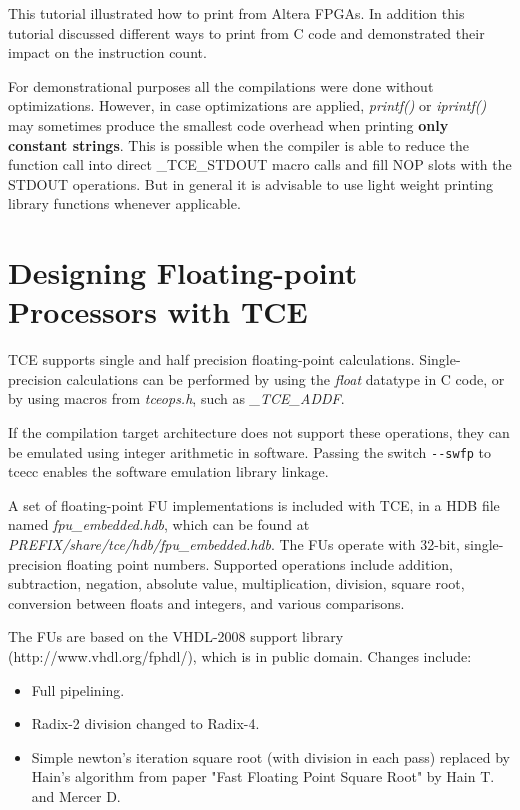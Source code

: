 \documentclass[twoside]{tceusermanual}
\begin{document}
This tutorial illustrated how to print from Altera FPGAs. In addition
this tutorial discussed different ways to print from C code and
demonstrated their impact on the instruction count.

For demonstrational purposes all the compilations were done without
optimizations. However, in case optimizations are applied,
\textit{printf()} or \textit{iprintf()} may sometimes produce the
smallest code overhead when printing \textbf{only constant strings}.
This is possible when the compiler is able to reduce the function call
into direct \_TCE\_STDOUT macro calls and fill NOP slots with the
STDOUT operations. But in general it is advisable to use light weight
printing library functions whenever applicable.


\section{Designing Floating-point Processors with TCE}

TCE supports single and half precision floating-point calculations. Single-precision calculations
can be performed by using the \emph{float} datatype in C code, or by using macros from 
\emph{tceops.h}, such as \emph{\_TCE\_ADDF}. 

If the compilation target architecture does not support these operations, 
they can be emulated using integer arithmetic in software. Passing the switch \verb|--swfp| 
to tcecc enables the software emulation library linkage.

A set of floating-point FU implementations is included with TCE, in a HDB file named 
\emph{fpu\_embedded.hdb}, which can be found at \emph{PREFIX/share/tce/hdb/fpu\_embedded.hdb}. 
The FUs operate with 32-bit, single-precision floating point numbers. 
Supported operations include addition, subtraction, negation, absolute value, 
multiplication, division, square root, conversion between floats and integers, 
and various comparisons.

The FUs are based on the VHDL-2008 support library (http://www.vhdl.org/fphdl/), 
which is in public domain. Changes include:

\begin{itemize}
 \item Full pipelining.
 \item Radix-2 division changed to Radix-4.
 \item Simple newton's iteration square root (with division in each pass) replaced 
by Hain's algorithm from paper "Fast Floating Point Square Root" by Hain T. and Mercer D.
\end{itemize}
\end{document}
